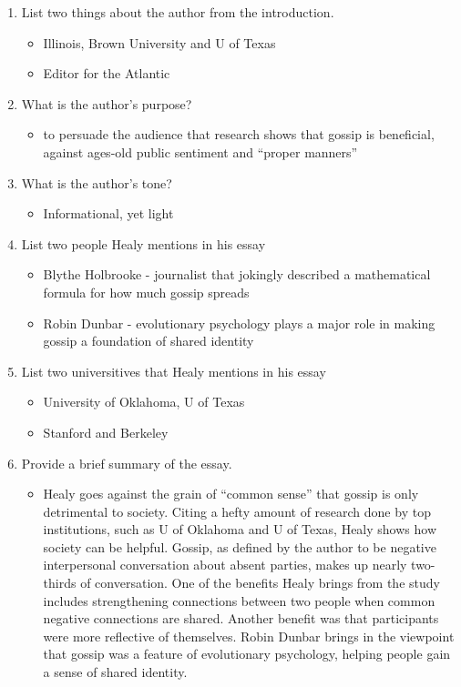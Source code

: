 \documentclass[12pt]{article}
\begin{document}
\begin{enumerate}
    \item List two things about the author from the introduction.
    \begin{itemize}
        \item Illinois, Brown University and U of Texas
        \item Editor for the Atlantic
    \end{itemize}

    \item What is the author's purpose?
    \begin{itemize}
        \item to persuade the audience that research shows that gossip is beneficial, against ages-old public sentiment and  ``proper manners''
    \end{itemize}
    
    \item What is the author's tone?
    \begin{itemize}
        \item Informational, yet light
    \end{itemize}
    
    \item List two people Healy mentions in his essay
    \begin{itemize}
        \item Blythe Holbrooke - journalist that jokingly described a mathematical formula for how much gossip spreads
        \item Robin Dunbar - evolutionary psychology plays a major role in making gossip a foundation of shared identity
    \end{itemize}

    \item List two universitives that Healy mentions in his essay
    \begin{itemize}
        \item University of Oklahoma, U of Texas
        \item Stanford and Berkeley
    \end{itemize}

    \item Provide a brief summary of the essay.
    \begin{itemize}
        \item Healy goes against the grain of ``common sense'' that gossip is only detrimental to society.
        Citing a hefty amount of research done by top institutions, such as U of Oklahoma and U of Texas, Healy shows how society can be helpful.
        Gossip, as defined by the author to be negative interpersonal conversation about absent parties, makes up nearly two-thirds of conversation.
        One of the benefits Healy brings from the study includes strengthening connections between two people when common negative connections are shared.
        Another benefit was that participants were more reflective of themselves.
        Robin Dunbar brings in the viewpoint that gossip was a feature of evolutionary psychology, helping people gain a sense of shared identity.
    \end{itemize}


\end{enumerate}
\end{document}

